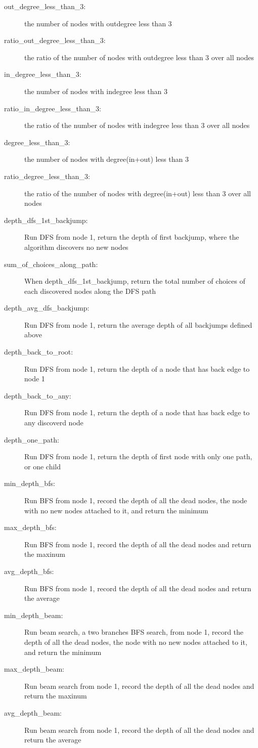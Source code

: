 \documentclass{new_tlp}
\begin{document}
\begin{description}
\item[out\_degree\_less\_than\_3:] the number of nodes with outdegree less than 3
\item[ratio\_out\_degree\_less\_than\_3:] the ratio of the number of nodes with outdegree less than 3 over all nodes
\item[in\_degree\_less\_than\_3:] the number of nodes with indegree less than 3
\item[ratio\_in\_degree\_less\_than\_3:] the ratio of the number of nodes with indegree less than 3 over all nodes
\item[degree\_less\_than\_3:] the number of nodes with degree(in+out) less than 3
\item[ratio\_degree\_less\_than\_3:] the ratio of the number of nodes with degree(in+out) less than 3 over all nodes
\item[depth\_dfs\_1st\_backjump:] Run DFS from node 1, return the depth of first backjump, where the algorithm discovers no new nodes
\item[sum\_of\_choices\_along\_path:] When depth\_dfs\_1st\_backjump, return the total number of choices of each discovered nodes along the DFS path
\item[depth\_avg\_dfs\_backjump:] Run DFS from node 1, return the average depth of all backjumps defined above
\item[depth\_back\_to\_root:] Run DFS from node 1, return the depth of a node that has back edge to node 1
\item[depth\_back\_to\_any:] Run DFS from node 1, return the depth of a node that has back edge to any discoverd node
\item[depth\_one\_path:] Run DFS from node 1, return the depth of first node with only one path, or one child
\item[min\_depth\_bfs:] Run BFS from node 1, record the depth of all the dead nodes, the node with no new nodes attached to it, and return the minimum
\item[max\_depth\_bfs:] Run BFS from node 1, record the depth of all the dead nodes and return the maxinum
\item[avg\_depth\_bfs:] Run BFS from node 1, record the depth of all the dead nodes and return the average
\item[min\_depth\_beam:] Run beam search, a two branches BFS search, from node 1, record the depth of all the dead nodes, the node with no new nodes attached to it, and return the minimum
\item[max\_depth\_beam:] Run beam search from node 1, record the depth of all the dead nodes and return the maxinum
\item[avg\_depth\_beam:] Run beam search from node 1, record the depth of all the dead nodes and return the average
\end{description}
\end{document}
